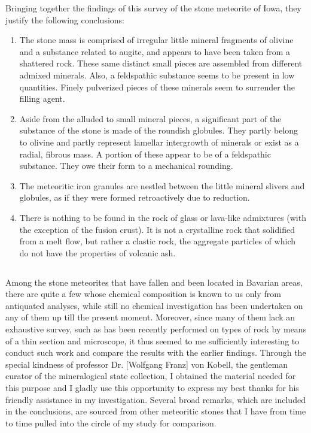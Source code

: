 \documentclass[a4paper, 12pt, oneside]{article}
\begin{document}
Bringing together the findings of this survey of the stone meteorite of Iowa, they justify the following conclusions:
\begin{enumerate}
    \item The stone mass is comprised of irregular little mineral fragments of olivine and a substance related to augite, and appears to have been taken from a shattered rock. These same distinct small pieces are assembled from different admixed minerals. Also, a feldspathic substance seems to be present in low quantities. Finely pulverized pieces of these minerals seem to surrender the filling agent.
    \item Aside from the alluded to small mineral pieces, a significant part of the substance of the stone is made of the roundish globules. They partly belong to olivine and partly represent lamellar intergrowth of minerals or exist as a radial, fibrous mass. A portion of these appear to be of a feldspathic substance. They owe their form to a mechanical rounding.
    \item The meteoritic iron granules are nestled between the little mineral slivers and globules, as if they were formed retroactively due to reduction.
    \item There is nothing to be found in the rock of glass or lava-like admixtures (with the exception of the fusion crust). It is not a crystalline rock that solidified from a melt flow, but rather a clastic rock, the aggregate particles of which do not have the properties of volcanic ash.
\end{enumerate}
\clearpage
\subsection{}
\subsubsection*{}
\paragraph*{}
Among the stone meteorites that have fallen and been located in Bavarian areas, there are quite a few whose chemical composition is known to us only from antiquated analyses, while still no chemical investigation has been undertaken on any of them up till the present moment. Moreover, since many of them lack an exhaustive survey, such as has been recently performed on types of rock by means of a thin section and microscope, it thus seemed to me sufficiently interesting to conduct such work and compare the results with the earlier findings. Through the special kindness of professor Dr. [Wolfgang Franz] von Kobell, the gentleman curator of the mineralogical state collection, I obtained the material needed for this purpose and I gladly use this opportunity to express my best thanks for his friendly assistance in my investigation. Several broad remarks, which are included in the conclusions, are sourced from other meteoritic stones that I have from time to time pulled into the circle of my study for comparison.
\end{document}
